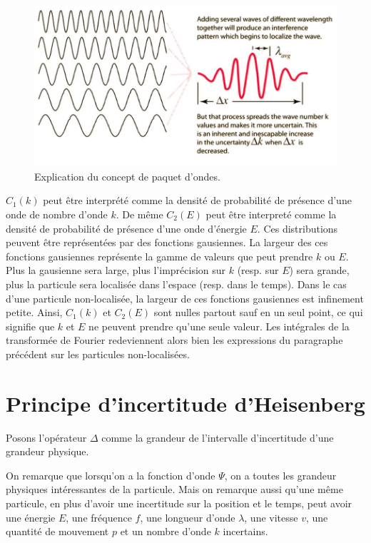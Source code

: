 \begin{figure}[ht!]
	\centering
	\includegraphics[scale=0.85]{wave_packets.jpg}
	\caption{Explication du concept de paquet d'ondes.}
	\label{fig:wave-packets}
\end{figure}

$C_1(k)$ peut être interprété comme la densité de probabilité
de présence d'une onde de nombre d'onde $k$. De même $C_2(E)$
peut être interpreté comme la densité de probabilité de
présence d'une onde d'énergie $E$. Ces distributions
peuvent être représentées par des fonctions gausiennes.
La largeur des ces fonctions gausiennes représente la
gamme de valeurs que peut prendre $k$ ou $E$. Plus la
gausienne sera large, plus l'imprécision sur $k$ (resp.
sur $E$) sera grande, plus la particule sera localisée
dans l'espace (resp. dans le temps).
Dans le cas d'une particule non-localisée, la largeur
de ces fonctions gausiennes est infinement petite. Ainsi,
$C_1(k)$ et $C_2(E)$ sont nulles partout sauf en un seul
point, ce qui signifie que $k$
et $E$ ne peuvent prendre qu'une seule valeur.
Les intégrales de la transformée de Fourier
redeviennent alors bien les expressions du paragraphe
précédent sur les particules non-localisées.

\section{Principe d'incertitude d'Heisenberg}
\begin{mynota}
  Posons l'opérateur $\Delta$ comme
  la grandeur de l’intervalle d'incertitude
  d'une grandeur physique.
\end{mynota}

On remarque que lorsqu'on a la fonction d'onde $\Psi$,
on a toutes les grandeur physiques intéressantes de la particule.
Mais on remarque aussi qu'une même particule,
en plus d'avoir une incertitude sur la position et le temps,
peut avoir une énergie $E$, une fréquence $f$,
une longueur d'onde $\lambda$, une vitesse $v$,
une quantité de mouvement $p$ et un nombre d'onde $k$ incertains.


